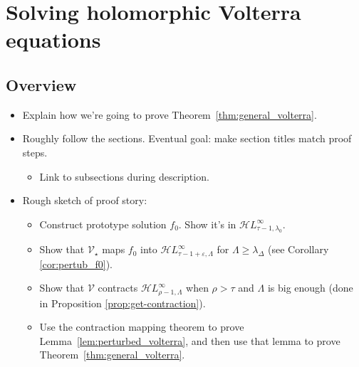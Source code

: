 \documentclass{article}
\theoremstyle{plain}
\newcommand{\singexp}[2]{\mathcal{H}L^\infty_{#1, #2}}
\newcommand{\expHoloL}[2]{\mathcal{H}L^{#1}_{#2}} %
\newcommand{\volterra}{\mathcal{V}}
\newcommand{\softpart}{\mathcal{V}_\star}
\newenvironment{brainstorm}{\color{violet}\begin{itemize}}{\end{itemize}\color{black}}
\begin{document}

\section{Solving holomorphic Volterra equations}
\subsection{Overview}
\begin{brainstorm}
\item Explain how we're going to prove Theorem~\ref{thm:general_volterra}.
\item Roughly follow the sections. Eventual goal: make section titles match proof steps.
\begin{itemize}
\item Link to subsections during description.
\end{itemize}
\item Rough sketch of proof story:
\begin{itemize}
    \item Construct prototype solution $f_0$. Show it's in $\singexp{\tau-1}{\lambda_0}$.
    \item Show that $\softpart$ maps $f_0$ into $\singexp{\tau-1+\varepsilon}{\Lambda}$ for $\Lambda\geq\lambda_\Delta$ (see Corollary \ref{cor:pertub_f0}).
    \item Show that $\volterra$ contracts $\singexp{\rho-1}{\Lambda}$ when $\rho > \tau$ and $\Lambda$ is big enough (done in Proposition \ref{prop:get-contraction}).
    \item Use the contraction mapping theorem to prove Lemma~\ref{lem:perturbed_volterra}, and then use that lemma to prove Theorem~\ref{thm:general_volterra}.
\end{itemize}
\end{brainstorm}
\end{document}
